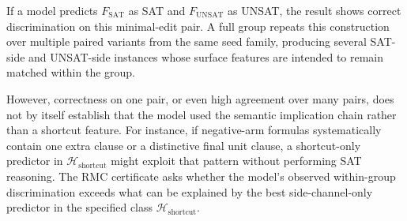 \documentclass[conference]{IEEEtran}
\theoremstyle{remark}
\newcommand{\shortcutHypCls}{\mathcal{H}_{\mathrm{shortcut}}}
\begin{document}
If a model predicts $F_{\mathrm{SAT}}$ as SAT and $F_{\mathrm{UNSAT}}$ as
UNSAT, the result shows correct discrimination on this minimal-edit pair.
A full group repeats this construction over multiple paired variants from the
same seed family, producing several SAT-side and UNSAT-side instances whose
surface features are intended to remain matched within the group.

However, correctness on one pair, or even high agreement over many pairs, does
not by itself establish that the model used the semantic implication chain
rather than a shortcut feature.
For instance, if negative-arm formulas systematically contain one extra clause
or a distinctive final unit clause, a shortcut-only predictor in
$\shortcutHypCls$ might exploit that pattern without performing SAT reasoning.
The RMC certificate asks whether the model's observed within-group
discrimination exceeds what can be explained by the best side-channel-only
predictor in the specified class $\shortcutHypCls$.
\end{document}
